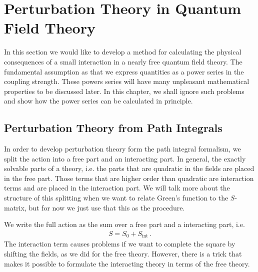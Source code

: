 \section{Perturbation Theory in Quantum Field Theory}\label{sec:Perturbation Theory in Quantum Field Theory}
In this section we would like to develop a method for calculating the physical consequences of a small interaction in a nearly free quantum field theory. The fundamental assumption as that we express quantities as a power series in the coupling strength. These powers series will have many unpleasant mathematical properties to be discussed later. In this chapter, we shall ignore such problems and show how the power series can be calculated in principle.

\subsection{Perturbation Theory from Path Integrals}\label{sec:Perturbation theory form path integrals}
In order to develop perturbation theory form the path integral formalism, we split the action into a free part and an interacting part. In general, the exactly solvable parts of a theory, i.e. the parts that are quadratic in the fields are placed in the free part. Those terms that are higher order than quadratic are interaction terms and are placed in the interaction part. We will talk more about the structure of this splitting when we want to relate Green's function to the $S$-matrix, but for now we just use that this as the procedure.

We write the full action as the sum over a free part and a interacting part, i.e.
\begin{align}\label{eq:split action}
    S=S_{0}+S_{\text{int}}\,.
\end{align}
The interaction term causes problems if we want to complete the square by shifting the fields, as we did for the free theory. However, there is a trick that makes it possible to formulate the interacting theory in terms of the free theory.

